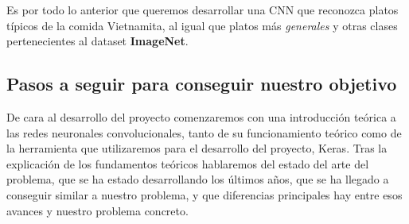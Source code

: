 \vspace{3 mm}

Es por todo lo anterior que queremos desarrollar una CNN que reconozca platos típicos de la comida Vietnamita, al igual que platos más \textit{generales} y otras clases pertenecientes al dataset \textbf{ImageNet}.


\subsection{Pasos a seguir para conseguir nuestro objetivo}

De cara al desarrollo del proyecto comenzaremos con una introducción teórica a las redes neuronales convolucionales, tanto de su funcionamiento teórico como de la herramienta que utilizaremos para el desarrollo del proyecto, Keras. Tras la explicación de los fundamentos teóricos hablaremos del estado del arte del problema, que se ha estado desarrollando los últimos años, que se ha llegado a conseguir similar a nuestro problema, y que diferencias principales hay entre esos avances y nuestro problema concreto.


